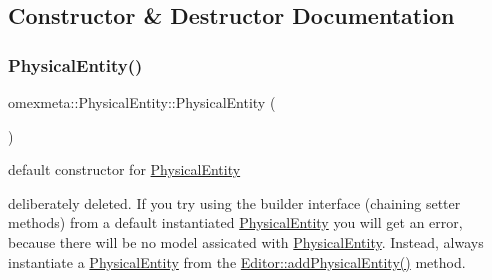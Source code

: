 \subsection{Constructor \& Destructor Documentation}
\mbox{\label{classomexmeta_1_1PhysicalEntity_a9d29348a080c64f91ff6ec184fd45ece}} 
\subsubsection{\texorpdfstring{Physical\+Entity()}{PhysicalEntity()}\hspace{0.1cm}{\footnotesize\ttfamily [1/4]}}
{\footnotesize\ttfamily omexmeta\+::\+Physical\+Entity\+::\+Physical\+Entity (\begin{DoxyParamCaption}{ }\end{DoxyParamCaption})\hspace{0.3cm}{\ttfamily [delete]}}



default constructor for \hyperlink{classomexmeta_1_1PhysicalEntity}{Physical\+Entity} 

deliberately deleted. If you try using the builder interface (chaining setter methods) from a default instantiated \hyperlink{classomexmeta_1_1PhysicalEntity}{Physical\+Entity} you will get an error, because there will be no model assicated with \hyperlink{classomexmeta_1_1PhysicalEntity}{Physical\+Entity}. Instead, always instantiate a \hyperlink{classomexmeta_1_1PhysicalEntity}{Physical\+Entity} from the \hyperlink{classomexmeta_1_1Editor_a0740831baafe244374ad7a324d51a87e}{Editor\+::add\+Physical\+Entity()} method. \mbox{\label{classomexmeta_1_1PhysicalEntity_a0341918665af91cacdb4481d037c42d2}} 
